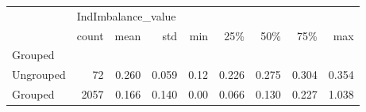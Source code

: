 \begin{tabular}{lrrrrrrrr}
\toprule
{} & \multicolumn{8}{l}{IndImbalance\_value} \\
{} &              count &   mean &    std &   min &    25\% &    50\% &    75\% &    max \\
Grouped   &                    &        &        &       &        &        &        &        \\
\midrule
Ungrouped &                 72 &  0.260 &  0.059 &  0.12 &  0.226 &  0.275 &  0.304 &  0.354 \\
Grouped   &               2057 &  0.166 &  0.140 &  0.00 &  0.066 &  0.130 &  0.227 &  1.038 \\
\bottomrule
\end{tabular}
